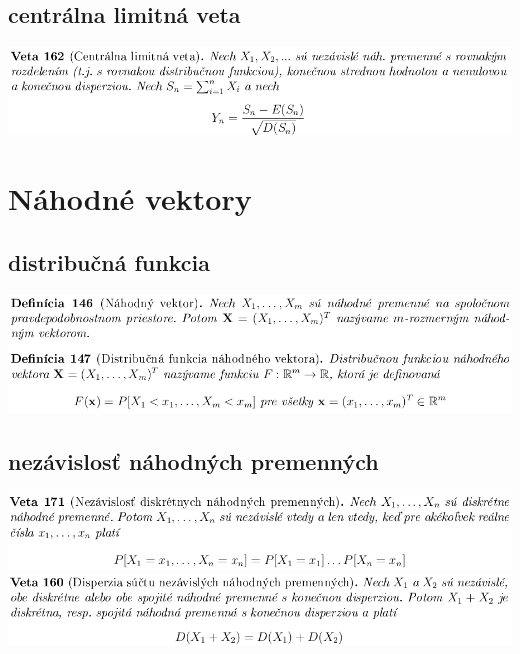 \subsection {centrálna limitná veta}
\includegraphics[width=1\textwidth]{images/cent_lim_vet}\\

\section{Náhodné vektory}

\subsection {distribučná funkcia}
\includegraphics[width=1\textwidth]{images/nah_vekt_dist_funk}\\
\subsection {nezávislosť náhodných premenných}
\includegraphics[width=1\textwidth]{images/nezav_nah_prem}\\
\includegraphics[width=1\textwidth]{images/disp_nezav_nah_prem}\\
